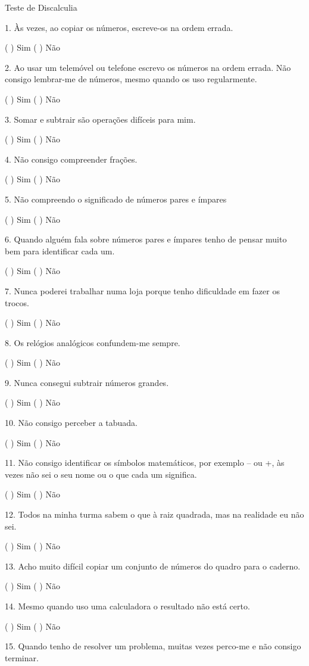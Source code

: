 \documentclass[
	12pt,				%
    oneside,			%
	a4paper,			%
	english,			%
	french,				%
	spanish,			%
	brazil,				%
	]{abntex2}
\begin{document}
\begin{apendicesenv}
Teste de Discalculia


1.	Às vezes, ao copiar os números, escreve-os na ordem errada.


( ) Sim
( ) Não


2.	 Ao usar um telemóvel ou telefone escrevo os números na ordem errada. Não consigo lembrar-me de números, mesmo quando os uso regularmente.


( ) Sim
( ) Não


3.	Somar e subtrair são operações difíceis para mim.


( ) Sim
( ) Não


4.	Não consigo compreender frações.


( ) Sim
( ) Não

5.	Não compreendo o significado de números pares e ímpares


( ) Sim
( ) Não


6.	Quando alguém fala sobre números pares e ímpares tenho de pensar muito bem para identificar cada um.


( ) Sim
( ) Não


7.	Nunca poderei trabalhar numa loja porque tenho dificuldade em fazer os trocos.


( ) Sim
( ) Não


8.	Os relógios analógicos confundem-me sempre.


( ) Sim
( ) Não


9.	Nunca consegui subtrair números grandes.


( ) Sim
( ) Não


10.	Não consigo perceber a tabuada.


( ) Sim
( ) Não


11.	Não consigo identificar os símbolos matemáticos, por exemplo – ou +, às vezes não sei o seu nome ou o que cada um significa.


( ) Sim
( ) Não


12.	Todos na minha turma sabem o que à raiz quadrada, mas na realidade eu não sei.


( ) Sim
( ) Não


13.	 Acho muito difícil copiar um conjunto de números do quadro para o caderno.


( ) Sim
( ) Não


14.	Mesmo quando uso uma calculadora o resultado não está certo.


( ) Sim
( ) Não


15.	Quando tenho de resolver um problema, muitas vezes perco-me e não consigo terminar.



\end{apendicesenv}
\end{document}
